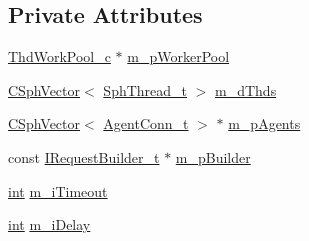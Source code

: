 \subsection*{Private Attributes}
\begin{DoxyCompactItemize}
\item 
\hyperlink{classThdWorkPool__c}{Thd\-Work\-Pool\-\_\-c} $\ast$ \hyperlink{classCSphRemoteAgentsController_a1761bc177b4e266d5d4dfef5bcf77946}{m\-\_\-p\-Worker\-Pool}
\item 
\hyperlink{classCSphVector}{C\-Sph\-Vector}$<$ \hyperlink{sphinxstd_8h_ad728334ec85e8a6b4db5bc1efd06447a}{Sph\-Thread\-\_\-t} $>$ \hyperlink{classCSphRemoteAgentsController_a10f53cd45e7c356412cb9610c0cab229}{m\-\_\-d\-Thds}
\item 
\hyperlink{classCSphVector}{C\-Sph\-Vector}$<$ \hyperlink{structAgentConn__t}{Agent\-Conn\-\_\-t} $>$ $\ast$ \hyperlink{classCSphRemoteAgentsController_a5ef815200dcdfa2b27d5bdae767cdfd1}{m\-\_\-p\-Agents}
\item 
const \hyperlink{structIRequestBuilder__t}{I\-Request\-Builder\-\_\-t} $\ast$ \hyperlink{classCSphRemoteAgentsController_a47d889a791191212a3a8d559aa69accf}{m\-\_\-p\-Builder}
\item 
\hyperlink{sphinxexpr_8cpp_a4a26e8f9cb8b736e0c4cbf4d16de985e}{int} \hyperlink{classCSphRemoteAgentsController_ad4578eba80fbf39c4dc8acdd596dfbf4}{m\-\_\-i\-Timeout}
\item 
\hyperlink{sphinxexpr_8cpp_a4a26e8f9cb8b736e0c4cbf4d16de985e}{int} \hyperlink{classCSphRemoteAgentsController_ac731d12587b2a906b25f65e4c88140bb}{m\-\_\-i\-Delay}
\end{DoxyCompactItemize}


